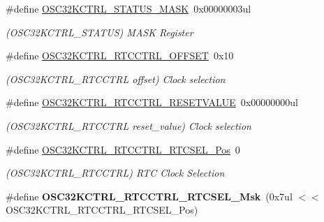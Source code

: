 \begin{DoxyCompactItemize}
\item 
\hypertarget{group___s_a_m_l21___o_s_c32_k_c_t_r_l_ga1951a838cab5c017c20ba51dcea40224}{}\#define \hyperlink{group___s_a_m_l21___o_s_c32_k_c_t_r_l_ga1951a838cab5c017c20ba51dcea40224}{O\+S\+C32\+K\+C\+T\+R\+L\+\_\+\+S\+T\+A\+T\+U\+S\+\_\+\+M\+A\+S\+K}~0x00000003ul\label{group___s_a_m_l21___o_s_c32_k_c_t_r_l_ga1951a838cab5c017c20ba51dcea40224}

\begin{DoxyCompactList}\small\item\em (O\+S\+C32\+K\+C\+T\+R\+L\+\_\+\+S\+T\+A\+T\+U\+S) M\+A\+S\+K Register \end{DoxyCompactList}\item 
\hypertarget{group___s_a_m_l21___o_s_c32_k_c_t_r_l_gaa2ebbecf02c02fa55aa17bb3f0099fbf}{}\#define \hyperlink{group___s_a_m_l21___o_s_c32_k_c_t_r_l_gaa2ebbecf02c02fa55aa17bb3f0099fbf}{O\+S\+C32\+K\+C\+T\+R\+L\+\_\+\+R\+T\+C\+C\+T\+R\+L\+\_\+\+O\+F\+F\+S\+E\+T}~0x10\label{group___s_a_m_l21___o_s_c32_k_c_t_r_l_gaa2ebbecf02c02fa55aa17bb3f0099fbf}

\begin{DoxyCompactList}\small\item\em (O\+S\+C32\+K\+C\+T\+R\+L\+\_\+\+R\+T\+C\+C\+T\+R\+L offset) Clock selection \end{DoxyCompactList}\item 
\hypertarget{group___s_a_m_l21___o_s_c32_k_c_t_r_l_ga7d97c06430481f93acb8a0290e2dad80}{}\#define \hyperlink{group___s_a_m_l21___o_s_c32_k_c_t_r_l_ga7d97c06430481f93acb8a0290e2dad80}{O\+S\+C32\+K\+C\+T\+R\+L\+\_\+\+R\+T\+C\+C\+T\+R\+L\+\_\+\+R\+E\+S\+E\+T\+V\+A\+L\+U\+E}~0x00000000ul\label{group___s_a_m_l21___o_s_c32_k_c_t_r_l_ga7d97c06430481f93acb8a0290e2dad80}

\begin{DoxyCompactList}\small\item\em (O\+S\+C32\+K\+C\+T\+R\+L\+\_\+\+R\+T\+C\+C\+T\+R\+L reset\+\_\+value) Clock selection \end{DoxyCompactList}\item 
\hypertarget{group___s_a_m_l21___o_s_c32_k_c_t_r_l_gadcfbd528df699f49aa94aed33cfa1324}{}\#define \hyperlink{group___s_a_m_l21___o_s_c32_k_c_t_r_l_gadcfbd528df699f49aa94aed33cfa1324}{O\+S\+C32\+K\+C\+T\+R\+L\+\_\+\+R\+T\+C\+C\+T\+R\+L\+\_\+\+R\+T\+C\+S\+E\+L\+\_\+\+Pos}~0\label{group___s_a_m_l21___o_s_c32_k_c_t_r_l_gadcfbd528df699f49aa94aed33cfa1324}

\begin{DoxyCompactList}\small\item\em (O\+S\+C32\+K\+C\+T\+R\+L\+\_\+\+R\+T\+C\+C\+T\+R\+L) R\+T\+C Clock Selection \end{DoxyCompactList}\item 
\hypertarget{group___s_a_m_l21___o_s_c32_k_c_t_r_l_ga592f890037599de9333c6be135f04c51}{}\#define {\bfseries O\+S\+C32\+K\+C\+T\+R\+L\+\_\+\+R\+T\+C\+C\+T\+R\+L\+\_\+\+R\+T\+C\+S\+E\+L\+\_\+\+Msk}~(0x7ul $<$$<$ O\+S\+C32\+K\+C\+T\+R\+L\+\_\+\+R\+T\+C\+C\+T\+R\+L\+\_\+\+R\+T\+C\+S\+E\+L\+\_\+\+Pos)\label{group___s_a_m_l21___o_s_c32_k_c_t_r_l_ga592f890037599de9333c6be135f04c51}


\end{DoxyCompactItemize}
